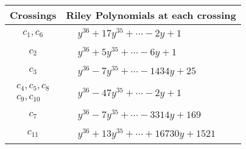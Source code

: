 \documentclass[1p]{elsarticle_modified}
\theoremstyle{definition}
\begin{document}
\begin{tabular}{m{50pt}|m{274pt}}
Crossings & \hspace{64pt}Riley Polynomials at each crossing \\
\hline $$\begin{aligned}c_{1},c_{6}\end{aligned}$$&$\begin{aligned}
&y^{36}+17 y^{35}+\cdots-2 y+1
\end{aligned}$\\
\hline $$\begin{aligned}c_{2}\end{aligned}$$&$\begin{aligned}
&y^{36}+5 y^{35}+\cdots-6 y+1
\end{aligned}$\\
\hline $$\begin{aligned}c_{3}\end{aligned}$$&$\begin{aligned}
&y^{36}-7 y^{35}+\cdots-1434 y+25
\end{aligned}$\\
\hline $$\begin{aligned}c_{4},c_{5},c_{8}\\c_{9},c_{10}\end{aligned}$$&$\begin{aligned}
&y^{36}-47 y^{35}+\cdots-2 y+1
\end{aligned}$\\
\hline $$\begin{aligned}c_{7}\end{aligned}$$&$\begin{aligned}
&y^{36}-7 y^{35}+\cdots-3314 y+169
\end{aligned}$\\
\hline $$\begin{aligned}c_{11}\end{aligned}$$&$\begin{aligned}
&y^{36}+13 y^{35}+\cdots+16730 y+1521
\end{aligned}$\\
\hline
\end{tabular}
\vskip 2pc
\end{document}
